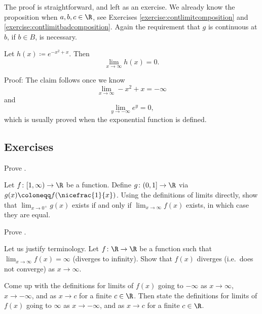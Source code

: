 The proof is straightforward, and left as an exercise.  We already
know the proposition when $a, b, c \in \R$, see Exercises
\ref{exercise:contlimitcomposition} and
\ref{exercise:contlimitbadcomposition}.  Again the requirement that $g$ is
continuous at $b$, if $b \in B$, is necessary.

\begin{example}
Let $h(x) \coloneqq e^{-x^2+x}$.  Then
\begin{equation*}
\lim_{x\to \infty} h(x) = 0 .
\end{equation*}

Proof:
The claim follows once we know
\begin{equation*}
\lim_{x\to \infty} -x^2+x = -\infty
\end{equation*}
and
\begin{equation*}
\lim_{y\to -\infty} e^y = 0 ,
\end{equation*}
which is usually proved when the exponential function is defined.
\end{example}

\subsection{Exercises}

\begin{exercise}
Prove .
\end{exercise}

\begin{exercise}
Let $f \colon [1,\infty) \to \R$ be a function.  Define
$g \colon (0,1] \to \R$ via $g(x) \coloneqq f(\nicefrac{1}{x})$.
Using the definitions of limits directly,
show that $\lim_{x\to 0^+} g(x)$
exists if and only if $\lim_{x\to \infty} f(x)$ exists, in which
case they are equal.
\end{exercise}

\begin{exercise}
Prove .
\end{exercise}

\begin{exercise}
Let us justify terminology.
Let $f \colon \R \to \R$ be a function such that
$\lim_{x \to \infty} f(x) = \infty$ (diverges to infinity).
Show that $f(x)$ diverges (i.e.\ does not converge) as $x \to \infty$.
\end{exercise}

\begin{exercise}
Come up with the definitions for limits of $f(x)$ going to $-\infty$ as $x \to
\infty$, $x \to -\infty$, and as $x \to c$ for a finite $c \in \R$.
Then state the definitions for limits of $f(x)$ going to $\infty$ 
as $x \to -\infty$, and as $x \to c$ for a finite $c \in \R$.
\end{exercise}

